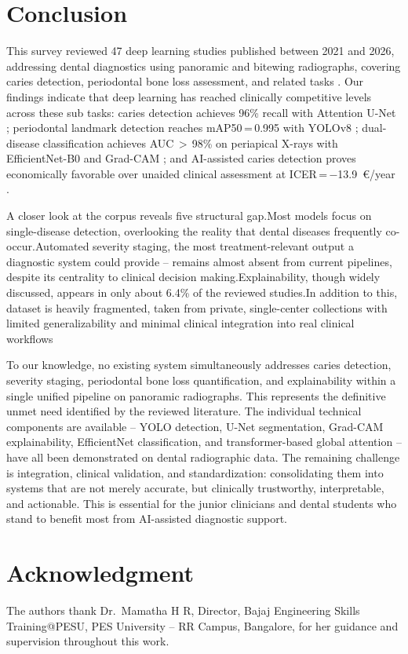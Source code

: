 \documentclass[conference]{IEEEtran}
\begin{document}
\section{Conclusion}
\label{sec:conclusion}

This survey reviewed 47 deep learning studies published between 2021 and 2026, addressing dental diagnostics using panoramic and bitewing radiographs, covering caries detection, periodontal bone loss assessment, and related tasks . Our findings indicate that deep learning has reached clinically competitive levels across these sub tasks: caries detection achieves 96\% recall with  Attention U-Net \cite{pornprasertsuk2025clinical};
periodontal landmark detection reaches mAP50\,=\,0.995 with YOLOv8
\cite{jundaeng2025advanced}; dual-disease classification achieves
AUC\,$>$\,98\% on periapical X-rays with EfficientNet-B0 and Grad-CAM
\cite{chen2023deep}; and AI-assisted caries detection proves economically
favorable over unaided clinical assessment at
ICER\,=\,$-$13.9~\euro/year \cite{schwendicke2021cost}.

A closer look at the corpus reveals five structural gap.Most models focus on single-disease detection, overlooking the reality that dental diseases frequently co-occur.Automated severity staging, the most treatment-relevant output a diagnostic system could provide -- remains almost absent from current pipelines, despite its centrality to clinical decision making.Explainability, though widely discussed, appears in only about 
6.4\% of the reviewed studies.In addition to this, dataset is heavily fragmented, taken from private, single-center collections with limited generalizability and minimal clinical integration into real clinical workflows

 To our knowledge, no existing system simultaneously addresses caries detection, severity staging, periodontal bone loss quantification, and explainability within a single unified pipeline on panoramic radiographs. This represents the definitive unmet need identified by the reviewed literature. The individual technical components are available -- YOLO detection, U-Net segmentation, Grad-CAM explainability, EfficientNet classification, and
transformer-based global attention -- have all been demonstrated on dental radiographic data. The remaining challenge is integration, clinical validation, and standardization: consolidating them into systems that are not merely accurate, but clinically trustworthy, interpretable, and actionable. This is essential for the junior clinicians and dental students who stand to benefit most from AI-assisted diagnostic support.


\section*{Acknowledgment}
The authors thank Dr.\ Mamatha H R, Director, Bajaj Engineering Skills
Training@PESU, PES University -- RR Campus, Bangalore, for her guidance
and supervision throughout this work.



\end{document}
